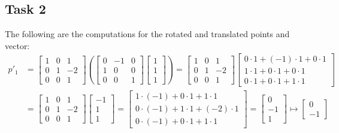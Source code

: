 \documentclass{article}
\begin{document}
\subsection{Task 2}
The following are the computations for the rotated and translated points and vector:
\begin{align*}
	p'_1 & =  \begin{bmatrix}1&0&1\\ 0&1&-2\\0&0&1\end{bmatrix} \left( \begin{bmatrix}0&-1&0\\ 1&0&0\\ 0&0&1\end{bmatrix}\begin{bmatrix}1\\ 1\\ 1\end{bmatrix} \right)  =  \begin{bmatrix}1&0&1\\ 0&1&-2\\0&0&1\end{bmatrix}\begin{bmatrix}0\cdot 1+\left(-1\right)\cdot 1+0\cdot 1\\ 1\cdot 1+0\cdot 1+0\cdot 1\\ 0\cdot 1+0\cdot 1+1\cdot 1\end{bmatrix} \\
	& = \begin{bmatrix}1&0&1\\ 0&1&-2\\0&0&1\end{bmatrix}\begin{bmatrix}-1\\ 1\\ 1\end{bmatrix} = \begin{bmatrix}1\cdot \left(-1\right)+0\cdot 1+1\cdot 1\\ 0\cdot \left(-1\right)+1\cdot 1+\left(-2\right)\cdot 1\\ 0\cdot \left(-1\right)+0\cdot 1+1\cdot 1\end{bmatrix} = \begin{bmatrix}0\\ -1\\ 1\end{bmatrix} \mapsto \begin{bmatrix}0\\ -1\end{bmatrix}
\end{align*}
\end{document}
